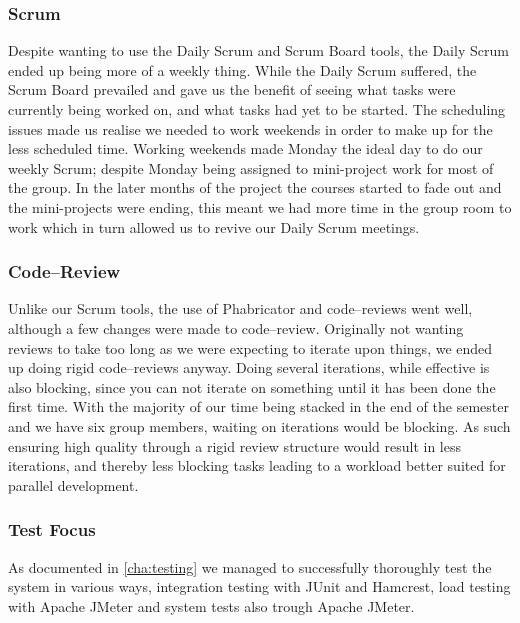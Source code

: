 \subsubsection{Scrum}
Despite wanting to use the Daily Scrum and Scrum Board tools, the Daily Scrum ended up being more of a weekly thing.
While the Daily Scrum suffered, the Scrum Board prevailed and gave us the benefit of seeing what tasks were currently being worked on, and what tasks had yet to be started.
The scheduling issues made us realise we needed to work weekends in order to make up for the less scheduled time.
Working weekends made Monday the ideal day to do our weekly Scrum; despite Monday being assigned to mini-project work for most of the group.
In the later months of the project the courses started to fade out and the mini-projects were ending, this meant we had more time in the group room to work which in turn allowed us to revive our Daily Scrum meetings.
\subsubsection{Code--Review}
Unlike our Scrum tools, the use of Phabricator and code--reviews went well, although a few changes were made to code--review.
Originally not wanting reviews to take too long as we were expecting to iterate upon things, we ended up doing rigid code--reviews anyway.
Doing several iterations, while effective is also blocking, since you can not iterate on something until it has been done the first time.
With the majority of our time being stacked in the end of the semester and we have six group members, waiting on iterations would be blocking.
As such ensuring high quality through a rigid review structure would result in less iterations, and thereby less blocking tasks leading to a workload better suited for parallel development.

\subsubsection{Test Focus}
As documented in \cref{cha:testing} we managed to successfully thoroughly test the system in various ways, integration testing with JUnit and Hamcrest, load testing with Apache JMeter and system tests also trough Apache JMeter.
